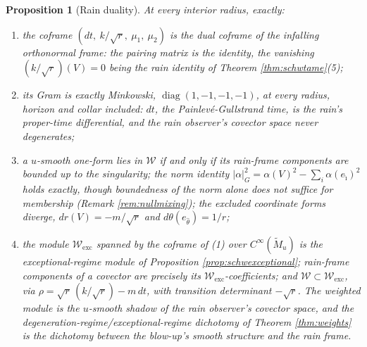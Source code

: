 \documentclass[11pt]{article}
\newtheorem{proposition}[theorem]{Proposition}
\theoremstyle{definition}
\newcommand{\shW}{\mathcal{W}}
\newcommand{\Mt}{\widetilde{M}}
\newcommand{\dtPG}{dt}
\begin{document}
\begin{proposition}[Rain duality]\label{prop:raindual}
At every interior radius, exactly:
\begin{enumerate}
\item the coframe $(\dtPG,\ k/\sqrt r,\ \mu_1,\ \mu_2)$ is the \emph{dual coframe} of the infalling orthonormal frame: the pairing matrix is the identity, the vanishing $(k/\sqrt r)(V) = 0$ being the rain identity of Theorem \ref{thm:schwtame}(5);
\item its Gram is exactly Minkowski, $\operatorname{diag}(1,-1,-1,-1)$, at every radius, horizon and collar included: $\dtPG$, the Painlev\'e-Gullstrand time, is the rain's proper-time differential, and the rain observer's covector space never degenerates;
\item a $u$-smooth one-form lies in $\shW$ if and only if its rain-frame components are bounded up to the singularity; the norm identity $|\alpha|_G^2 = \alpha(V)^2 - \sum_i \alpha(e_{\hat\imath})^2$ holds exactly, though boundedness of the norm alone does not suffice for membership (Remark \ref{rem:nullmixing}); the excluded coordinate forms diverge, $dr(V) = -m/\sqrt r$ and $d\theta(e_{\hat\theta}) = 1/r$;
\item the module $\shW_{\mathrm{exc}}$ spanned by the coframe of (1) over $C^\infty(\Mt_u)$ is the exceptional-regime module of Proposition \ref{prop:schwexceptional}; rain-frame components of a covector are precisely its $\shW_{\mathrm{exc}}$-coefficients; and $\shW \subset \shW_{\mathrm{exc}}$, via $\rho = \sqrt r\,(k/\sqrt r) - m\,\dtPG$, with transition determinant $-\sqrt r$. The weighted module is the $u$-smooth shadow of the rain observer's covector space, and the degeneration-regime/exceptional-regime dichotomy of Theorem \ref{thm:weights} is the dichotomy between the blow-up's smooth structure and the rain frame.
\end{enumerate}
\end{proposition}
\end{document}
